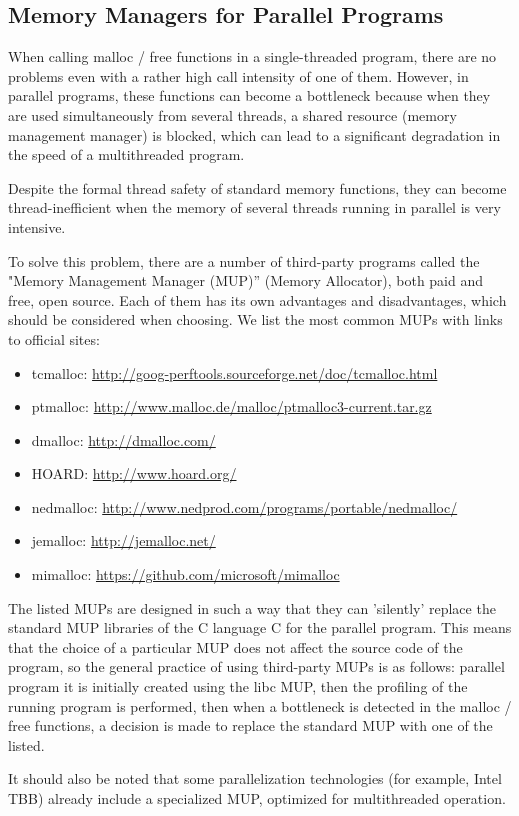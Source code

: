 { %
	\subsection{Memory Managers for Parallel Programs}
	\par When calling malloc / free functions in a single-threaded program, there are no problems even with a rather high call intensity of one of them. However, in parallel programs, these functions can become a bottleneck because when they are used simultaneously from several threads, a shared resource (memory management manager) is blocked, which can lead to a significant degradation in the speed of a multithreaded program.
	\par Despite the formal thread safety of standard memory functions, they can become thread-inefficient when the memory of several threads running in parallel is very intensive.
	\par To solve this problem, there are a number of third-party programs called the "Memory Management Manager (MUP)'' (Memory Allocator), both paid and free, open source. Each of them has its own advantages and disadvantages, which should be considered when choosing. We list the most common MUPs with links to official sites:
	\begin{itemize}
		\sloppy
		\item tcmalloc: \url{http://goog-perftools.sourceforge.net/doc/tcmalloc.html}
		\item ptmalloc: \url{http://www.malloc.de/malloc/ptmalloc3-current.tar.gz}
		\item dmalloc: \url{http://dmalloc.com/}
		\item HOARD: \url{http://www.hoard.org/}
		\item nedmalloc: \url{http://www.nedprod.com/programs/portable/nedmalloc/}
		\item jemalloc: \url{http://jemalloc.net/}
		\item mimalloc: \url{https://github.com/microsoft/mimalloc}
	\end{itemize}
	\par The listed MUPs are designed in such a way that they can 'silently' replace the standard MUP libraries of the C language C for the parallel program. This means that the choice of a particular MUP does not affect the source code of the program, so the general practice of using third-party MUPs is as follows: parallel program it is initially created using the libc MUP, then the profiling of the running program is performed, then when a bottleneck is detected in the malloc / free functions, a decision is made to replace the standard MUP with one of the listed.
	\par It should also be noted that some parallelization technologies (for example, Intel TBB) already include a specialized MUP, optimized for multithreaded operation.
	\par
}